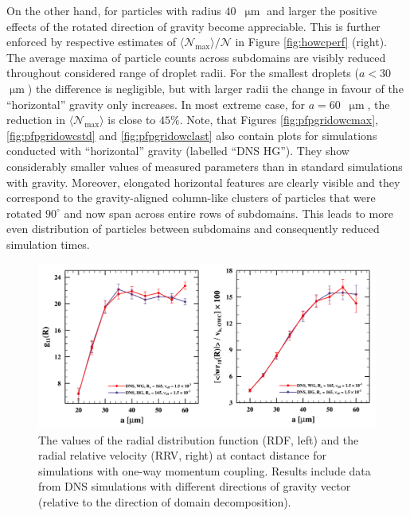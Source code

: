 \documentclass{pracamgren}
\begin{document}
On the other hand, for particles with radius $40$~$\upmu\text{m}$ and larger the positive effects of the rotated direction of gravity become appreciable.
This is further enforced by respective estimates of $\langle \mathcal{N}_{\max} \rangle / \mathcal{N}$ in Figure \ref{fig:howcperf} (right).
The average maxima of particle counts across subdomains are visibly reduced throughout considered range of droplet radii.
For the smallest droplets (${a < 30}$~$\upmu\text{m}$) the difference is negligible, but with larger radii the change in favour of the ``horizontal'' gravity only increases.
In most extreme case, for ${a = 60}$~$\upmu\text{m}$, the reduction in $\langle \mathcal{N}_{\max} \rangle$ is close to $45 \%$.
Note, that Figures \ref{fig:pfpgridowcmax}, \ref{fig:pfpgridowcstd} and \ref{fig:pfpgridowclast} also contain plots for simulations conducted with ``horizontal'' gravity (labelled ``DNS HG'').
They show considerably smaller values of measured parameters than in standard simulations with gravity.
Moreover, elongated horizontal features are clearly visible and they correspond to the gravity-aligned column-like clusters of particles that were rotated $90^{\circ}$ and now span across entire rows of subdomains.
This leads to more even distribution of particles between subdomains and consequently reduced simulation times.

\begin{figure}[!ht]
\centering
\includegraphics[width=13.5cm]{figures/3-22_howcrdfrrv.pdf}
\caption{
The values of the radial distribution function (RDF, left) and the radial relative velocity (RRV, right) at contact distance for simulations with one-way momentum coupling.
Results include data from DNS simulations with different directions of gravity vector (relative to the direction of domain decomposition).
}
\label{fig:howcrdfrrv}
\end{figure}
\end{document}
